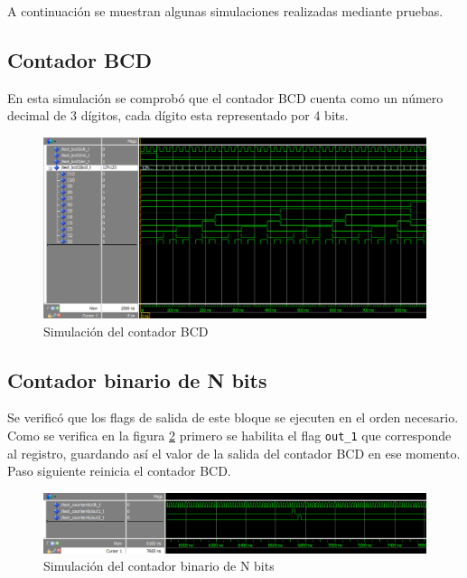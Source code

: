 \documentclass[10pt,spanish,a4paper,openany,notitlepage]{article}
\begin{document}
A continuación se muestran algunas simulaciones realizadas mediante pruebas.

\subsection{Contador BCD}

En esta simulación se comprobó que el contador BCD cuenta como un número
decimal de 3 dígitos, cada dígito esta representado por 4 bits.

\begin{figure}[H] %
\begin{center}
\includegraphics[scale=0.5]{./imagenes/bcd3_test.png}
\caption{Simulación del contador BCD}
 \label{fig:sim_bcd}
\end{center}
\end{figure}


\subsection{Contador binario de N bits}

Se verificó que los flags de salida de este bloque se ejecuten en el
orden necesario. Como se verifica en la figura \ref{fig:sim_counter}
primero se habilita el flag \texttt{out\_1} que corresponde al registro,
guardando así el valor de la salida del contador BCD en ese momento.
Paso siguiente reinicia el contador BCD.

\begin{figure}[H] %
\begin{center}
\includegraphics[scale=0.5]{./imagenes/Counter_test.png}
\caption{Simulación del contador binario de N bits}
 \label{fig:sim_counter}
\end{center}
\end{figure}
\end{document}
